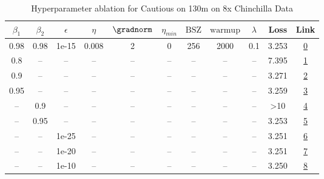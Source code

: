 \begin{table}[H]
\centering
\caption{Hyperparameter ablation for Cautious on 130m on 8x Chinchilla Data}
\label{tab:ablation_cautious_130m_on_8x_chinchilla_data}
\begin{tabular}{ccccccccccc}
\toprule
$\beta_1$ & $\beta_2$ & $\epsilon$ & $\eta$ & $\gradnorm$ & $\eta_{min}$ & $\mathrm{BSZ}$ & $\mathrm{warmup}$ & $\lambda$ & Loss & Link \\
\midrule
0.98 & 0.98 & 1e-15 & 0.008 & 2 & 0 & 256 & 2000 & 0.1 & 3.253 & \href{https://wandb.ai/stanford-mercury/optimizer-scaling/runs/sweep-130m-21B-cautious3e1de9lr0.008-wd0.1-minlr0-warmup2000-b10-8f1bb6}{0} \\
\midrule
0.8 & -- & -- & -- & -- & -- & -- & -- & -- & 7.395 & \href{https://wandb.ai/stanford-mercury/optimizer-scaling/runs/sweep-130m-21B-cautious903025lr0.008-wd0.1-minlr0-warmup2000-b10-c9b0ed}{1} \\
0.9 & -- & -- & -- & -- & -- & -- & -- & -- & 3.271 & \href{https://wandb.ai/stanford-mercury/optimizer-scaling/runs/sweep-130m-21B-cautiousdb200alr0.008-wd0.1-minlr0-warmup2000-b10-d34aeb}{2} \\
0.95 & -- & -- & -- & -- & -- & -- & -- & -- & 3.259 & \href{https://wandb.ai/stanford-mercury/optimizer-scaling/runs/sweep-130m-21B-cautious1b41e3lr0.008-wd0.1-minlr0-warmup2000-b10-e60376}{3} \\
-- & 0.9 & -- & -- & -- & -- & -- & -- & -- & >10 & \href{https://wandb.ai/stanford-mercury/optimizer-scaling/runs/sweep-130m-21B-cautious918292lr0.008-wd0.1-minlr0-warmup2000-b10-43c09c}{4} \\
-- & 0.95 & -- & -- & -- & -- & -- & -- & -- & 3.253 & \href{https://wandb.ai/stanford-mercury/optimizer-scaling/runs/sweep-130m-21B-cautious8370eflr0.008-wd0.1-minlr0-warmup2000-b10-beca91}{5} \\
-- & -- & 1e-25 & -- & -- & -- & -- & -- & -- & 3.251 & \href{https://wandb.ai/stanford-mercury/optimizer-scaling/runs/sweep-130m-21B-cautious40f0d8lr0.008-wd0.1-minlr0-warmup2000-b10-5be279}{6} \\
-- & -- & 1e-20 & -- & -- & -- & -- & -- & -- & 3.251 & \href{https://wandb.ai/stanford-mercury/optimizer-scaling/runs/sweep-130m-21B-cautious000697lr0.008-wd0.1-minlr0-warmup2000-b10-767fda}{7} \\
-- & -- & 1e-10 & -- & -- & -- & -- & -- & -- & 3.250 & \href{https://wandb.ai/stanford-mercury/optimizer-scaling/runs/sweep-130m-21B-cautious3d84f2lr0.008-wd0.1-minlr0-warmup2000-b10-222f29}{8} \\

\end{tabular}
\end{table}
